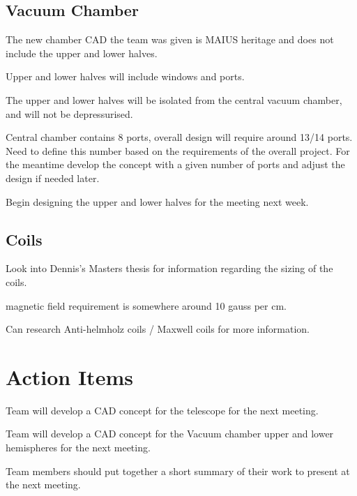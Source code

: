 \documentclass{meetingmins}
\begin{document}
    \subsection{Vacuum Chamber}
    \begin{subitems}
        \item The new chamber CAD the team was given is MAIUS heritage and does not include the upper and lower halves.
        \item Upper and lower halves will include windows and ports.
        \item The upper and lower halves will be isolated from the central vacuum chamber, and will not be depressurised.
        \item Central chamber contains 8 ports, overall design will require around 13/14 ports. 
            Need to define this number based on the requirements of the overall project. 
            For the meantime develop the concept with a given number of ports and adjust the design if needed later.
        \item Begin designing the upper and lower halves for the meeting next week.
    \end{subitems}
    \subsection{Coils}
    \begin{subitems}
        \item Look into Dennis's Masters thesis for information regarding the sizing of the coils. 
        \item magnetic field requirement is somewhere around 10 gauss per cm. 
        \item Can research Anti-helmholz coils / Maxwell coils for more information.
    \end{subitems}
\section{Action Items}
    \begin{items}
        \item Team will develop a CAD concept for the telescope for the next meeting.
        \item Team will develop a CAD concept for the Vacuum chamber upper and lower hemispheres for the next meeting.
        \item Team members should put together a short summary of their work to present at the next meeting.
    \end{items}

\end{document}
